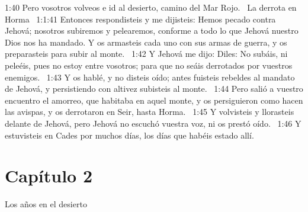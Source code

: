 1:40 Pero vosotros volveos e id al desierto, camino del Mar Rojo.  
La derrota en Horma   
1:1:41 Entonces respondisteis y me dijisteis: Hemos pecado contra Jehová; nosotros subiremos y pelearemos, conforme a todo lo que Jehová nuestro Dios nos ha mandado. Y os armasteis cada uno con sus armas de guerra, y os preparasteis para subir al monte.  
1:42 Y Jehová me dijo: Diles: No subáis, ni peleéis, pues no estoy entre vosotros; para que no seáis derrotados por vuestros enemigos.  
1:43 Y os hablé, y no disteis oído; antes fuisteis rebeldes al mandato de Jehová, y persistiendo con altivez subisteis al monte.  
1:44 Pero salió a vuestro encuentro el amorreo, que habitaba en aquel monte, y os persiguieron como hacen las avispas, y os derrotaron en Seir, hasta Horma.  
1:45 Y volvisteis y llorasteis delante de Jehová, pero Jehová no escuchó vuestra voz, ni os prestó oído.  
1:46 Y estuvisteis en Cades por muchos días, los días que habéis estado allí.  
\section*{Capítulo 2}
Los años en el desierto  

